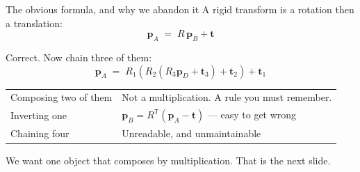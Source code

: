 \documentclass[aspectratio=169]{beamer}
\begin{document}
\begin{frame}{The obvious formula, and why we abandon it}
  \small
  A rigid transform is a rotation then a translation:
  \[ \mathbf{p}_A \;=\; R\,\mathbf{p}_B + \mathbf{t} \]

  \vspace{0.4em}
  Correct. Now chain three of them:
  \[ \mathbf{p}_A \;=\; R_1(R_2(R_3\mathbf{p}_D + \mathbf{t}_3) + \mathbf{t}_2) + \mathbf{t}_1 \]

  \vspace{0.5em}
  \begin{center}
  \begin{tabular}{@{}ll@{}}
    \toprule
    Composing two of them & Not a multiplication. A rule you must remember. \\
    Inverting one & $\mathbf{p}_B = R^{\mathsf T}(\mathbf{p}_A - \mathbf{t})$ --- easy to get wrong \\
    Chaining four & Unreadable, and unmaintainable \\
    \bottomrule
  \end{tabular}
  \end{center}

  \vspace{0.5em}
  \centering We want one object that composes by multiplication. That is the next slide.
\end{frame}
\end{document}
